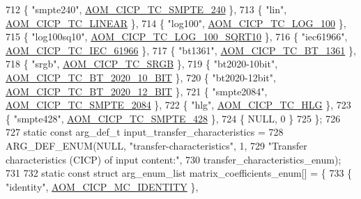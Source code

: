 \begin{DoxyCodeInclude}
{{{{{{{712   \{ \textcolor{stringliteral}{"smpte240"}, \hyperlink{aom__image_8h_a30655997e3fb79889ee23eb294cb1992ac3b5e95e3400830c334268fca69a1226}{AOM\_CICP\_TC\_SMPTE\_240} \},
713   \{ \textcolor{stringliteral}{"lin"}, \hyperlink{aom__image_8h_a30655997e3fb79889ee23eb294cb1992a99ebdb0b1a35e0bf25808f851aa80a35}{AOM\_CICP\_TC\_LINEAR} \},
714   \{ \textcolor{stringliteral}{"log100"}, \hyperlink{aom__image_8h_a30655997e3fb79889ee23eb294cb1992a54ec8cfad46215d855696bafe371ffe1}{AOM\_CICP\_TC\_LOG\_100} \},
715   \{ \textcolor{stringliteral}{"log100sq10"}, \hyperlink{aom__image_8h_a30655997e3fb79889ee23eb294cb1992a7d79c257042a5958bafa6b5ccfbd96cb}{AOM\_CICP\_TC\_LOG\_100\_SQRT10} \},
716   \{ \textcolor{stringliteral}{"iec61966"}, \hyperlink{aom__image_8h_a30655997e3fb79889ee23eb294cb1992a57f92f410badf8a43b19df18edc9b8b9}{AOM\_CICP\_TC\_IEC\_61966} \},
717   \{ \textcolor{stringliteral}{"bt1361"}, \hyperlink{aom__image_8h_a30655997e3fb79889ee23eb294cb1992ac60ca749a2d0ca1c860d82f0825a3e2d}{AOM\_CICP\_TC\_BT\_1361} \},
718   \{ \textcolor{stringliteral}{"srgb"}, \hyperlink{aom__image_8h_a30655997e3fb79889ee23eb294cb1992a94553e773e3d3fb005236ed70eeedfea}{AOM\_CICP\_TC\_SRGB} \},
719   \{ \textcolor{stringliteral}{"bt2020-10bit"}, \hyperlink{aom__image_8h_a30655997e3fb79889ee23eb294cb1992a1ce5fbca5277266680d70bb7211646d6}{AOM\_CICP\_TC\_BT\_2020\_10\_BIT} \},
720   \{ \textcolor{stringliteral}{"bt2020-12bit"}, \hyperlink{aom__image_8h_a30655997e3fb79889ee23eb294cb1992afcc74c6858aefc13c426dd6992198e75}{AOM\_CICP\_TC\_BT\_2020\_12\_BIT} \},
721   \{ \textcolor{stringliteral}{"smpte2084"}, \hyperlink{aom__image_8h_a30655997e3fb79889ee23eb294cb1992ab48fdcc8c2c0350f6423b9c116c1876d}{AOM\_CICP\_TC\_SMPTE\_2084} \},
722   \{ \textcolor{stringliteral}{"hlg"}, \hyperlink{aom__image_8h_a30655997e3fb79889ee23eb294cb1992a3d7b83c425c539d1a36fb36e9aebf268}{AOM\_CICP\_TC\_HLG} \},
723   \{ \textcolor{stringliteral}{"smpte428"}, \hyperlink{aom__image_8h_a30655997e3fb79889ee23eb294cb1992a45df590313483af0c614708f346028c4}{AOM\_CICP\_TC\_SMPTE\_428} \},
724   \{ NULL, 0 \}
725 \};
726 
727 \textcolor{keyword}{static} \textcolor{keyword}{const} arg\_def\_t input\_transfer\_characteristics =
728     ARG\_DEF\_ENUM(NULL, \textcolor{stringliteral}{"transfer-characteristics"}, 1,
729                  \textcolor{stringliteral}{"Transfer characteristics (CICP) of input content:"},
730                  transfer\_characteristics\_enum);
731 
732 \textcolor{keyword}{static} \textcolor{keyword}{const} \textcolor{keyword}{struct }arg\_enum\_list matrix\_coefficients\_enum[] = \{
733   \{ \textcolor{stringliteral}{"identity"}, \hyperlink{aom__image_8h_a6bc018ed9689367acae810bc58527081a17489bf0aed544427f7c6bbe4837b212}{AOM\_CICP\_MC\_IDENTITY} \},
}}}}}}}
\end{DoxyCodeInclude}
